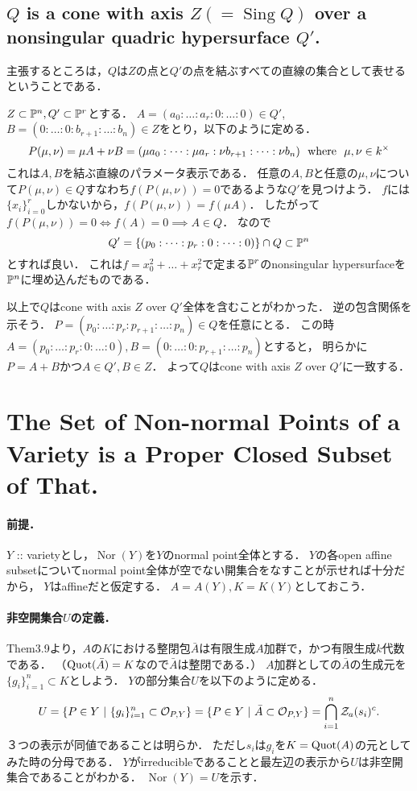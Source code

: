 \documentclass[a4paper]{jsarticle}
\newcommand{\Sing}{\operatorname{Sing}}
\newcommand{\Nor}{\operatorname{Nor}}
\begin{document}
    \subsection{$Q$ is a cone with axis $Z (=\Sing Q)$ over a nonsingular quadric hypersurface $Q'$.}
    主張するところは，$Q$は$Z$の点と$Q'$の点を結ぶすべての直線の集合として表せるということである．

    $Z \subset \mathbb{P}^n, Q' \subset \mathbb{P}^r$とする．
    $A=(a_0:\dots:a_r:0:\dots:0) \in Q'$, $B=(0:\dots:0:b_{r+1}:\dots:b_n) \in Z$をとり，以下のように定める．
    \[ P(\mu,\nu)=\mu A+\nu B=(\mu a_0:\dots:\mu a_r:\nu b_{r+1}:\dots:\nu b_{n}) \text{~~where~~} \mu, \nu \in k^{\times} \]
    これは$A, B$を結ぶ直線のパラメータ表示である．
    任意の$A,B$と任意の$\mu,\nu$について$P(\mu,\nu) \in Q$すなわち$f(P(\mu,\nu))=0$であるような$Q'$を見つけよう．
    $f$には$\{x_i\}_{i=0}^{r}$しかないから，$f(P(\mu,\nu))=f(\mu A)$．
    したがって$f(P(\mu,\nu))=0 \iff f(A)=0 \implies A \in Q$．
    なので
    \[ Q'=\{ (p_0:\dots:p_r:0:\dots:0) \} \cap Q \subset \mathbb{P}^n \]
    とすれば良い．
    これは$f=x_0^2+\dots+x_r^2$で定まる$\mathbb{P}^r$のnonsingular hypersurfaceを$\mathbb{P}^n$に埋め込んだものである．

    以上で$Q$はcone with axis $Z$ over $Q'$全体を含むことがわかった．
    逆の包含関係を示そう．
    $P=(p_0:\dots:p_r:p_{r+1}:\dots:p_n) \in Q$を任意にとる．
    この時$A=(p_0:\dots:p_r:0:\dots:0), B=(0:\dots:0:p_{r+1}:\dots:p_n)$とすると，
    明らかに$P=A+B$かつ$A \in Q', B \in Z$．
    よって$Q$はcone with axis $Z$ over $Q'$に一致する．

\section{The Set of Non-normal Points of a Variety is a Proper Closed Subset of That.} %
    \paragraph{前提．}
    $Y$ :: varietyとし，$\Nor(Y)$を$Y$のnormal point全体とする．
    $Y$の各open affine subsetについてnormal point全体が空でない開集合をなすことが示せれば十分だから，
    $Y$はaffineだと仮定する．
    $A=A(Y), K=K(Y)$としておこう．

    \paragraph{非空開集合$U$の定義．}
    Them3.9より，$A$の$K$における整閉包$\bar{A}$は有限生成$A$加群で，かつ有限生成$k$代数である．
    （$\operatorname{Quot}(\bar{A})=K$なので$\bar{A}$は整閉である．）
    $A$加群としての$\bar{A}$の生成元を$\{g_i\}_{i=1}^n \subset K$としよう．
    $Y$の部分集合$U$を以下のように定める．
    \[
        U
        =\{ P \in Y ~|~ \{g_i\}_{i=1}^n \subset \mathcal{O}_{P,Y} \}
        =\{ P \in Y ~|~ \bar{A} \subset \mathcal{O}_{P,Y} \}
        =\bigcap_{i=1}^n \mathcal{Z}_a(s_i)^c.
    \]
    ３つの表示が同値であることは明らか．
    ただし$s_i$は$g_i$を$K=\operatorname{Quot}(A)$の元としてみた時の分母である．
    $Y$がirreducibleであることと最左辺の表示から$U$は非空開集合であることがわかる．
    $\Nor(Y)=U$を示す．
\end{document}
